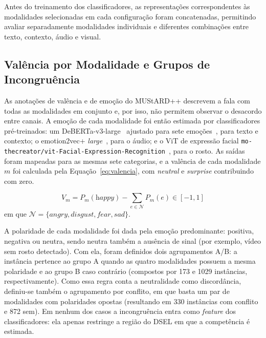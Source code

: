 \documentclass[conference]{IEEEtran}
\begin{document}
 Antes do treinamento dos classificadores, as representações correspondentes às modalidades selecionadas em cada configuração foram concatenadas, permitindo avaliar separadamente modalidades individuais e diferentes combinações entre texto, contexto, áudio e visual.


\subsection{Valência por Modalidade e Grupos de Incongruência}
\label{subsec:incongruencia}

As anotações de valência e de emoção do MUStARD++ descrevem a fala com todas as modalidades em conjunto e, por isso, não permitem observar o desacordo entre canais. A emoção de cada modalidade foi então estimada por classificadores pré-treinados: um DeBERTa-v3-large~\cite{he2023debertav3} ajustado para sete emoções~\cite{tanneru2025deberta}, para texto e contexto; o emotion2vec+ \textit{large}~\cite{ma2024emotion2vec}, para o áudio; e o ViT de expressão facial \texttt{mo-thecreator/vit-Facial-Expression-Recognition}~\cite{dosovitskiy2021vit, motheecreator_vitfer}, para o rosto. As saídas foram mapeadas para as mesmas sete categorias, e a valência de cada modalidade $m$ foi calculada pela Equação~\ref{eq:valencia}, com \textit{neutral} e \textit{surprise} contribuindo com zero.

\begin{equation}
\label{eq:valencia}
V_m = P_m(\textit{happy}) - \sum_{e \in \mathcal{N}} P_m(e) \in [-1, 1]
\end{equation}
em que $\mathcal{N} = \{\textit{angry}, \textit{disgust}, \textit{fear}, \textit{sad}\}$.

A polaridade de cada modalidade foi dada pela emoção predominante: positiva, negativa ou neutra, sendo neutra também a ausência de sinal (por exemplo, vídeo sem rosto detectado). Com ela, foram definidos dois agrupamentos A/B: a instância pertence ao grupo A quando as quatro modalidades possuem a mesma polaridade e ao grupo B caso contrário (compostos por 173 e 1029 instâncias, respectivamente). Como essa regra conta a neutralidade como discordância, definiu-se também o agrupamento por conflito, em que basta um par de modalidades com polaridades opostas (resultando em 330 instâncias com conflito e 872 sem). Em nenhum dos casos a incongruência entra como \textit{feature} dos classificadores: ela apenas restringe a região do DSEL em que a competência é estimada.
\end{document}
